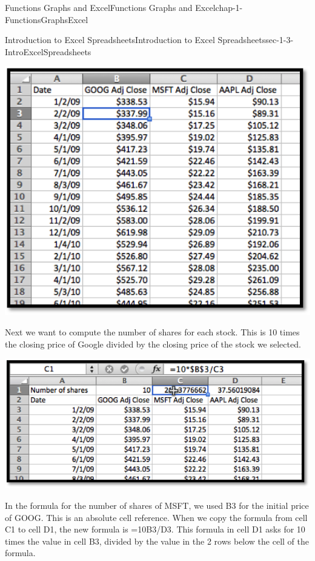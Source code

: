 \documentclass[oneside,10pt,]{book}
\numberwithin{equation}{section}
\begin{document}
\begin{chapterptx}{Functions Graphs and Excel}{}{Functions Graphs and Excel}{}{}{chap-1-FunctionsGraphsExcel}
\begin{sectionptx}{Introduction to Excel Spreadsheets}{}{Introduction to Excel Spreadsheets}{}{}{sec-1-3-IntroExcelSpreadsheets}
\begin{sidebyside}{1}{0.1}{0.1}{0}
\begin{sbspanel}{0.8}
\includegraphics[width=1\linewidth]{images/sec1-3-9SharePrices.png}
\end{sbspanel}%
\end{sidebyside}%
\par
\hypertarget{p-251}{}%
Next we want to compute the number of shares for each stock.  This is 10 times the closing price of Google divided by the closing price of the stock we selected.%
\begin{sidebyside}{1}{0.1}{0.1}{0}%
\begin{sbspanel}{0.8}%
\includegraphics[width=1\linewidth]{images/sec1-3-10ShareAjustments.png}
\end{sbspanel}%
\end{sidebyside}%
\par
\hypertarget{p-252}{}%
In the formula for the number of shares of MSFT, we used \textdollar{}B\textdollar{}3 for the initial price of GOOG.  This is an absolute cell reference.  When we copy the formula from cell C1 to cell D1, the new formula is =10\textasteriskcentered{}\textdollar{}B\textdollar{}3\slash{}D3.  This formula in cell D1 asks for 10 times the value in cell B3, divided by the value in the 2 rows below the cell of the formula.%

\end{sectionptx}
\end{chapterptx}
\end{document}
